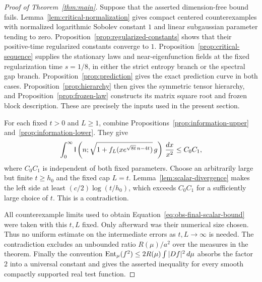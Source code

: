 \begin{proof}[Proof of Theorem~\ref{thm:main}]
Suppose that the asserted dimension-free bound fails.
Lemma~\ref{lem:critical-normalization} gives compact centered
counterexamples with normalized logarithmic Sobolev constant $1$
and linear subgaussian parameter tending to zero.
Proposition~\ref{prop:regularized-constants} shows that their
positive-time regularized constants converge to $1$.
Proposition~\ref{prop:critical-sequence} supplies the stationary
laws and near-eigenfunction fields at the fixed regularization
time $s=1/8$, in either the strict entropy branch or the spectral
gap branch.  Proposition~\ref{prop:prediction} gives the exact
prediction curve in both cases.  Proposition~\ref{prop:hierarchy}
then gives the symmetric tensor hierarchy, and
Proposition~\ref{prop:frozen-law} constructs its matrix square
root and frozen block description.  These are precisely the
inputs used in the present section.

For each fixed $t>0$ and $L\ge1$, combine
Propositions~\ref{prop:information-upper}
and~\ref{prop:information-lower}.  They give
\begin{equation}\label{eq:obs-final-scalar-bound}
 \int_0^\infty
 \mathsf I\left(n;
 \sqrt{1+f_L(xe^{\sqrt{8t}\,n-4t})}\,g\right)
       \,\frac{dx}{x^2}\le C_0C_1,
\end{equation}
where $C_0C_1$ is independent of both fixed parameters.
Choose an arbitrarily large but finite $t\ge h_0$ and the
fixed cap $L=t$.  Lemma~\ref{lem:scalar-divergence} makes the
left side at least $(c/2)\log(t/h_0)$, which exceeds $C_0C_1$
for a sufficiently large choice of $t$.  This is a contradiction.

All counterexample limits used to obtain
Equation~\eqref{eq:obs-final-scalar-bound} were taken with this
$t,L$ fixed.  Only afterward was their numerical size chosen.
Thus no uniform estimate on the intermediate errors as
$t,L\to\infty$ is needed.  The contradiction excludes an
unbounded ratio $R(\mu)/a^2$ over the measures in the theorem.
Finally the convention
$\operatorname{Ent}_\mu(f^2)\le2R(\mu)\int|Df|^2\,d\mu$
absorbs the factor $2$ into a universal constant and gives the
asserted inequality for every smooth compactly supported real
test function.
\end{proof}
